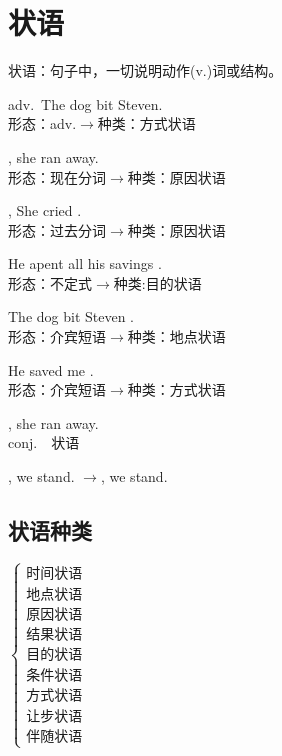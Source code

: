 \section{状语}
\begin{definition}
	状语：句子中，一切说明动作(v.)词或结构。
\end{definition}
\begin{example}
	adv.\ The dog  bit Steven.\\
	形态：adv.$\rightarrow$种类：方式状语
\end{example}
\begin{example}
	, she ran away.\\形态：现在分词$\rightarrow$种类：原因状语
\end{example}
\begin{example}
	, She cried .\\
	形态：过去分词$\rightarrow$种类：原因状语
\end{example}
\begin{example}
	He apent all his savings .\\
	形态：不定式$\rightarrow$种类:目的状语
\end{example}
\begin{example}
	The dog  bit Steven .\\
	形态：介宾短语$\rightarrow$种类：地点状语
\end{example}
\begin{example}
	He saved me .\\
	形态：介宾短语$\rightarrow$种类：方式状语
\end{example}
\begin{example}
	, she ran away.\\
	conj.\ \ 状语
\end{example}
\begin{example}
	, we stand. $\rightarrow$, we stand.
\end{example}
\subsection{状语种类}
$
\left\{
\begin{array}{l}
\textbf{时间状语}\\
\textbf{地点状语}\\
\textbf{原因状语}\\
\textbf{结果状语}\\
\textbf{目的状语}\\
\textbf{条件状语}\\
\textbf{方式状语}\\
\textbf{让步状语}\\
\textbf{伴随状语}
\end{array}
\right.
$
